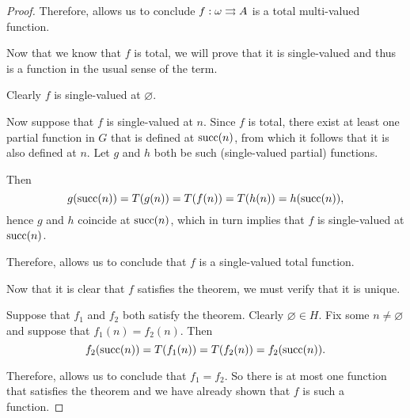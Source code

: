 \begin{proof}
  Therefore,  allows us to conclude \( f: \omega \rightrightarrows A \) is a total multi-valued function.

   Now that we know that \( f \) is total, we will prove that it is single-valued and thus is a function in the usual sense of the term.

  Clearly \( f \) is single-valued at \( \varnothing \).

  Now suppose that \( f \) is single-valued at \( n \). Since \( f \) is total, there exist at least one partial function in \( G \) that is defined at \( \operatorname{succ}(n) \), from which it follows that it is also defined at \( n \).  Let \( g \) and \( h \) both be such (single-valued partial) functions.

  Then
  \begin{equation*}
    g(\operatorname{succ}(n)) = T(g(n)) = T(f(n)) = T(h(n)) = h(\operatorname{succ}(n)),
  \end{equation*}
  hence \( g \) and \( h \) coincide at \( \operatorname{succ}(n) \), which in turn implies that \( f \) is single-valued at \( \operatorname{succ}(n) \).

  Therefore,  allows us to conclude that \( f \) is a single-valued total function.

   Now that it is clear that \( f \) satisfies the theorem, we must verify that it is unique.

  Suppose that \( f_1 \) and \( f_2 \) both satisfy the theorem. Clearly \( \varnothing \in H \). Fix some \( n \neq \varnothing \) and suppose that \( f_1(n) = f_2(n) \). Then
  \begin{equation*}
    f_2(\operatorname{succ}(n)) = T(f_1(n)) = T(f_2(n)) = f_2(\operatorname{succ}(n)).
  \end{equation*}

  Therefore,  allows us to conclude that \( f_1 = f_2 \). So there is at most one function that satisfies the theorem and we have already shown that \( f \) is such a function.
\end{proof}


